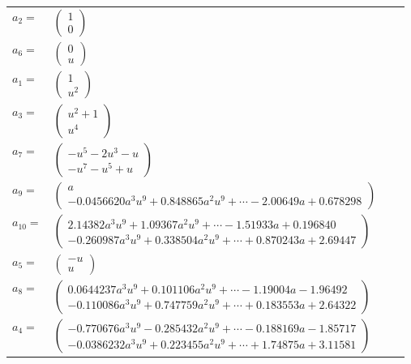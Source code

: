 \documentclass[1p]{elsarticle_modified}
\theoremstyle{definition}
\begin{document}
\begin{tabular}{m{7pt} m{180pt} m{7pt} m{180pt} }
\flushright $a_{2}=$&$\begin{pmatrix}1\\0\end{pmatrix}$ \\
\flushright $a_{6}=$&$\begin{pmatrix}0\\u\end{pmatrix}$ \\
\flushright $a_{1}=$&$\begin{pmatrix}1\\u^2\end{pmatrix}$ \\
\flushright $a_{3}=$&$\begin{pmatrix}u^2+1\\u^4\end{pmatrix}$ \\
\flushright $a_{7}=$&$\begin{pmatrix}- u^5-2 u^3- u\\- u^7- u^5+u\end{pmatrix}$ \\
\flushright $a_{9}=$&$\begin{pmatrix}a\\-0.0456620 a^{3} u^{9}+0.848865 a^{2} u^{9}+\cdots-2.00649 a+0.678298\end{pmatrix}$ \\
\flushright $a_{10}=$&$\begin{pmatrix}2.14382 a^{3} u^{9}+1.09367 a^{2} u^{9}+\cdots-1.51933 a+0.196840\\-0.260987 a^{3} u^{9}+0.338504 a^{2} u^{9}+\cdots+0.870243 a+2.69447\end{pmatrix}$ \\
\flushright $a_{5}=$&$\begin{pmatrix}- u\\u\end{pmatrix}$ \\
\flushright $a_{8}=$&$\begin{pmatrix}0.0644237 a^{3} u^{9}+0.101106 a^{2} u^{9}+\cdots-1.19004 a-1.96492\\-0.110086 a^{3} u^{9}+0.747759 a^{2} u^{9}+\cdots+0.183553 a+2.64322\end{pmatrix}$ \\
\flushright $a_{4}=$&$\begin{pmatrix}-0.770676 a^{3} u^{9}-0.285432 a^{2} u^{9}+\cdots-0.188169 a-1.85717\\-0.0386232 a^{3} u^{9}+0.223455 a^{2} u^{9}+\cdots+1.74875 a+3.11581\end{pmatrix}$ \\

\end{tabular}
\end{document}
